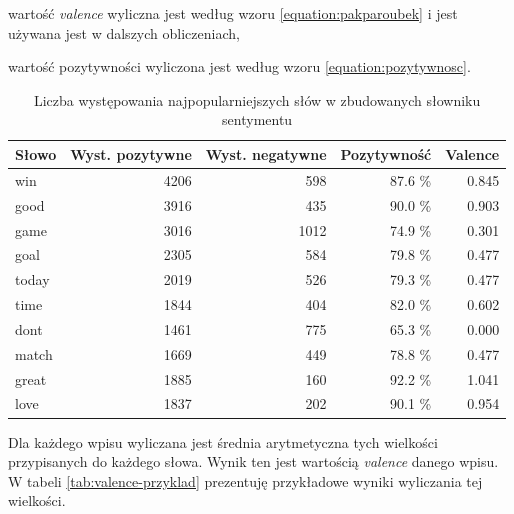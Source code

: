 wartość \textit{valence} wyliczna jest według wzoru \ref{equation:pakparoubek} 
i jest używana jest w dalszych obliczeniach,

wartość pozytywności wyliczona jest według wzoru \ref{equation:pozytywnosc}.

\begin{table}[ht!]  
\begin{center}  
\begin{tabular}{|l|r|r|r|r|}
\hline
Słowo & Wyst. pozytywne  & Wyst. negatywne 
& Pozytywność
& Valence
\\ \hline 
win & 4206 & 598 & 87.6 \% & 0.845 \\ \hline
good & 3916 & 435 & 90.0 \% & 0.903 \\ \hline
game & 3016 & 1012 & 74.9 \% & 0.301 \\ \hline
goal & 2305 & 584 & 79.8 \% & 0.477 \\ \hline
today & 2019 & 526 & 79.3 \% & 0.477 \\ \hline
time & 1844 & 404 & 82.0 \% & 0.602 \\ \hline
dont & 1461 & 775 & 65.3 \% & 0.000 \\ \hline
match & 1669 & 449 & 78.8 \% & 0.477 \\ \hline
great & 1885 & 160 & 92.2 \% & 1.041 \\ \hline
love & 1837 & 202 & 90.1 \% & 0.954 \\ \hline
\end{tabular} 
\end{center} 
\caption{Liczba występowania najpopularniejszych słów w zbudowanych słowniku
sentymentu}
\label{tab:liczebnosc-slow-sentymentu}
\end{table}

Dla każdego wpisu wyliczana jest średnia arytmetyczna tych wielkości
przypisanych do każdego słowa. Wynik ten jest wartością \textit{valence} danego
wpisu. W tabeli \ref{tab:valence-przyklad} prezentuję przykładowe wyniki
wyliczania tej wielkości.

